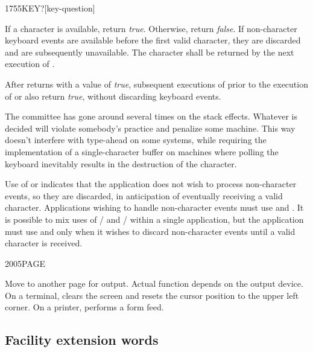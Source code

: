 \begin{worddef}[KEYq]{1755}{KEY?}[key-question]
\item {}

	If a character is available, return \emph{true}. Otherwise,
	return \emph{false}. If non-character keyboard events are
	available before the first valid character, they are discarded
	and are subsequently unavailable. The character shall be
	returned by the next execution of .

	After  returns with a value of \emph{true},
	subsequent executions of  prior to the execution
	of  or  also return \emph{true},
	without discarding keyboard events.

	\begin{rationale} %
		The committee has gone around several times on the
		stack effects. Whatever is decided will violate somebody's
		practice and penalize some machine. This way doesn't interfere
		with type-ahead on some systems, while requiring the
		implementation of a single-character buffer on machines where
		polling the keyboard inevitably results in the destruction of
		the character.

		Use of  or  indicates that the
		application does not wish to process non-character events,
		so they are discarded, in anticipation of eventually receiving
		a valid character. Applications wishing to handle non-character
		events must use  and . It is possible
		to mix uses of / and
		/ within a single application, but
		the application must use  and  only
		when it wishes to discard non-character events until a valid
		character is received.
	\end{rationale}
\end{worddef}


\begin{worddef}{2005}{PAGE}
\item \stack{}{}

	Move to another page for output. Actual function depends on the
	output device. On a terminal,  clears the screen and
	resets the cursor position to the upper left corner. On a
	printer,  performs a form feed.
\end{worddef}


\subsection{Facility extension words} %
\extended\vspace{1ex}

